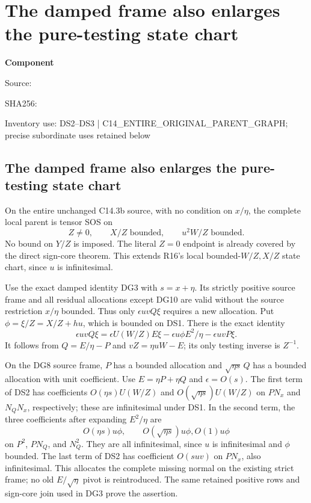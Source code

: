 \chapter{The damped frame also enlarges the pure-testing state chart}
\label{component:p8cfada778490}
\noindent\textbf{Component }\par
{\small\noindent Source: \par}
{\small\noindent SHA256: \par}
{\small\noindent Inventory use: DS2--DS3 | C14\_\allowbreak{}ENTIRE\_\allowbreak{}ORIGINAL\_\allowbreak{}PARENT\_\allowbreak{}GRAPH; precise subordinate uses retained below\par}
\medskip
\section{The damped frame also enlarges the pure-testing state chart}

\begin{proposition}
On the entire unchanged C14.3b source, with no condition on $x/\eta$,
the complete local parent is tensor SOS on
\[
 Z\ne0,\qquad X/Z\text{ bounded},\qquad
                         u^2W/Z\text{ bounded}.       \tag{DS1}
\]
No bound on $Y/Z$ is imposed. The literal $Z=0$ endpoint is already
covered by the direct sign-core theorem. This extends R16's local
bounded-$W/Z,X/Z$ state chart, since $u$ is infinitesimal.
\end{proposition}

Use the exact damped identity DG3 with $s=x+\eta$. Its strictly
positive source frame and all residual allocations except DG10 are
valid without the source restriction $x/\eta$ bounded. Thus only
$\epsilon uvQ\xi$ requires a new allocation. Put
$\phi=\xi/Z=X/Z+hu$, which is bounded on DS1. There is the exact
identity
\[
 \boxed{\quad
 \epsilon uvQ\xi
 =\epsilon U(W/Z)E\xi
       -\epsilon u\phi E^2/\eta-\epsilon uvP\xi.
 \quad}                                                   \tag{DS2}
\]
It follows from $Q=E/\eta-P$ and $vZ=\eta uW-E$; its only testing
inverse is $Z^{-1}$.

On the DG8 source frame, $P$ has a bounded allocation and
$\sqrt{\eta s}\,Q$ has a bounded allocation with unit coefficient.
Use $E=\eta P+\eta Q$ and $\epsilon=O(s)$. The first term of DS2
has coefficients $O(\eta s)U(W/Z)$ and
$O(\sqrt{\eta s})U(W/Z)$ on $PN_x$ and $N_QN_x$, respectively;
these are infinitesimal under DS1. In the second term, the three
coefficients after expanding $E^2/\eta$ are
\[
 O(\eta s)u\phi,\qquad O(\sqrt{\eta s})u\phi,
                                      O(1)u\phi
\]
on $P^2$, $PN_Q$, and $N_Q^2$. They are all infinitesimal, since
$u$ is infinitesimal and $\phi$ bounded. The last term of DS2 has
coefficient $O(suv)$ on $PN_x$, also infinitesimal. This allocates
the complete missing normal on the existing strict frame; no old
$E/\sqrt\eta$ pivot is reintroduced. The same retained positive
rows and sign-core join used in DG3 prove the assertion.

